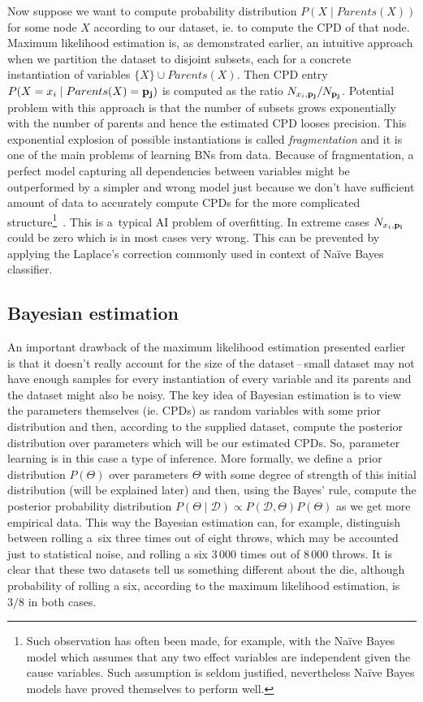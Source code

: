 \documentclass[english,cover]{fitthesis} %
\newcommand{\term}[1]{\emph{#1}}           %
\newcommand{\vars}[1]{{\bold{#1}}}         %
\begin{document}
Now suppose we want to compute probability distribution $P(X \mid Parents(X))$ for some node $X$ according to our dataset, ie. to compute the CPD of that node.
Maximum likelihood estimation is, as demonstrated earlier, an intuitive approach when we partition the dataset to disjoint subsets, each for a concrete instantiation of variables $\lbrace X \rbrace \cup Parents(X)$. Then CPD entry $P(X=x_i \mid Parents(X) = \vars{p_j})$ is computed as the ratio $N_{x_i,\vars{p_j}} / N_{\vars{p_j}}$. Potential problem with this approach is that the number of subsets grows exponentially with the number of parents and hence the estimated CPD looses precision. This exponential explosion of possible instantiations is called \term{fragmentation} and it is one of the main problems of learning BNs from data. Because of fragmentation, a perfect model capturing all dependencies between variables might be outperformed by a simpler and wrong model just because we don't have sufficient amount of data to accurately compute CPDs for the more complicated structure\footnote{Such observation has often been made, for example, with the Naïve Bayes model which assumes that any two effect variables are independent given the cause variables. Such assumption is seldom justified, nevertheless Naïve Bayes models have proved themselves to perform well.}~\cite{pgm}. This is a~typical AI problem of overfitting. In extreme cases $N_{x_i,\vars{p_i}}$ could be zero which is in most cases very wrong. This can be prevented by applying the Laplace's correction commonly used in context of Naïve Bayes classifier.


\subsection{Bayesian estimation}
An important drawback of the maximum likelihood estimation presented earlier is that it doesn't really account for the size of the dataset\,--\,small dataset may not have enough samples for every instantiation of every variable and its parents and the dataset might also be noisy. The key idea of Bayesian estimation is to view the parameters themselves (ie. CPDs) as random variables with some prior distribution and then, according to the supplied dataset, compute the posterior distribution over parameters which will be our estimated CPDs. So, parameter learning is in this case a type of inference.
More formally, we define a~prior distribution $P(\Theta)$ over parameters $\Theta$ with some degree of strength of this initial distribution (will be explained later) and then, using the Bayes' rule, compute the posterior probability distribution $P(\Theta \mid \mathcal{D}) \propto P(\mathcal{D},\Theta) P(\Theta)$ as we get more empirical data. This way the Bayesian estimation can, for example, distinguish between rolling a~six three times out of eight throws, which may be accounted just to statistical noise, and rolling a six 3\,000 times out of 8\,000 throws. It is clear that these two datasets tell us something different about the die, although probability of rolling a six, according to the maximum likelihood estimation, is $3/8$ in both cases.
\end{document}
